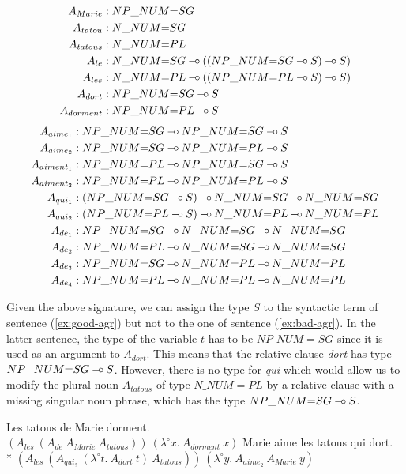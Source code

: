 \begin{align*}
A_{Marie} &: NP\_NUM{=}SG \\
A_{tatou} &: N\_NUM{=}SG \\
A_{tatous} &: N\_NUM{=}PL \\
A_{le} &: N\_NUM{=}SG \mathbin{{-}\mkern-3.5mu{\circ}} ((NP\_NUM{=}SG \mathbin{{-}\mkern-3.5mu{\circ}} S) \mathbin{{-}\mkern-3.5mu{\circ}} S) \\
A_{les} &: N\_NUM{=}PL \mathbin{{-}\mkern-3.5mu{\circ}} ((NP\_NUM{=}PL \mathbin{{-}\mkern-3.5mu{\circ}} S) \mathbin{{-}\mkern-3.5mu{\circ}} S) \\
A_{dort} &: NP\_NUM{=}SG \mathbin{{-}\mkern-3.5mu{\circ}} S \\
A_{dorment} &: NP\_NUM{=}PL \mathbin{{-}\mkern-3.5mu{\circ}} S \\
\end{align*}
\begin{align*}
A_{aime_1} &: NP\_NUM{=}SG \limp NP\_NUM{=}SG \limp S \\
A_{aime_2} &: NP\_NUM{=}SG \limp NP\_NUM{=}PL \limp S \\
A_{aiment_1} &: NP\_NUM{=}PL \limp NP\_NUM{=}SG \limp S \\
A_{aiment_2} &: NP\_NUM{=}PL \limp NP\_NUM{=}PL \limp S \\
A_{qui_1} &: (NP\_NUM{=}SG \limp S) \limp N\_NUM{=}SG \limp N\_NUM{=}SG \\
A_{qui_2} &: (NP\_NUM{=}PL \limp S) \limp N\_NUM{=}PL \limp N\_NUM{=}PL \\
A_{de_1} &: NP\_NUM{=}SG \limp N\_NUM{=}SG \limp N\_NUM{=}SG \\
A_{de_2} &: NP\_NUM{=}PL \limp N\_NUM{=}SG \limp N\_NUM{=}SG \\
A_{de_3} &: NP\_NUM{=}SG \limp N\_NUM{=}PL \limp N\_NUM{=}PL \\
A_{de_4} &: NP\_NUM{=}PL \limp N\_NUM{=}PL \limp N\_NUM{=}PL
\end{align*}

Given the above signature, we can assign the type $S$ to the syntactic
term of sentence (\ref{ex:good-agr}) but not to the one of sentence
(\ref{ex:bad-agr}). In the latter sentence, the type of the variable $t$
has to be $NP\_NUM{=}SG$ since it is used as an argument to
$A_{dort}$. This means that the relative clause \emph{dort} has type
$NP\_NUM{=}SG \mathbin{{-}\mkern-3.5mu{\circ}} S$. However, there is no type for \emph{qui} which
would allow us to modify the plural noun $A_{tatous}$ of type
$N\_NUM{=}PL$ by a relative clause with a missing singular noun phrase,
which has the type $NP\_NUM{=}SG \mathbin{{-}\mkern-3.5mu{\circ}} S$.

\begin{exe}
  \ex \label{ex:good-agr} Les tatous de Marie dorment. \\
      $(A_{les}\ (A_{de}\ A_{Marie}\ A_{tatous}))\ (\lambda^{\circ} x.\ A_{dorment}\ x)$
  \ex * \label{ex:bad-agr} Marie aime les tatous qui dort. \\
      * $(A_{les}\ (A_{qui_?}\ (\lambda^{\circ} t.\ A_{dort}\ t)\ A_{tatous}))\ (\lambda^{\circ} y.\ A_{aime_2}\ A_{Marie}\ y)$
\end{exe}

